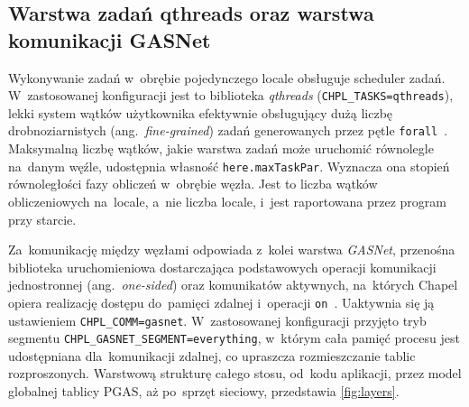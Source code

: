 \subsection{Warstwa zadań qthreads oraz warstwa komunikacji GASNet}

Wykonywanie zadań w~obrębie pojedynczego locale obsługuje scheduler
zadań. W~zastosowanej konfiguracji jest to biblioteka \emph{qthreads}
(\texttt{CHPL\_TASKS=qthreads}), lekki system wątków użytkownika efektywnie
obsługujący dużą liczbę drobnoziarnistych (ang.~\emph{fine-grained}) zadań generowanych przez pętle
\texttt{forall}~\cite{qthreads}. Maksymalną liczbę wątków, jakie warstwa zadań może
uruchomić równolegle na~danym węźle, udostępnia własność \texttt{here.maxTaskPar}. Wyznacza ona
stopień równoległości fazy obliczeń w~obrębie węzła. Jest to liczba wątków obliczeniowych na~locale,
a~nie liczba locale, i~jest raportowana przez program przy starcie.

Za~komunikację między węzłami odpowiada z~kolei warstwa \emph{GASNet}, przenośna biblioteka uruchomieniowa dostarczająca podstawowych operacji komunikacji
jednostronnej (ang.\ \emph{one-sided}) oraz komunikatów aktywnych, na~których
Chapel opiera realizację dostępu do~pamięci zdalnej i~operacji \texttt{on}~\cite{gasnet,gasnet-spec}.
Uaktywnia się ją ustawieniem \texttt{CHPL\_COMM=gasnet}. W~zastosowanej
konfiguracji przyjęto tryb segmentu
\texttt{CHPL\_\allowbreak GASNET\_\allowbreak SEGMENT\allowbreak =everything},
w~którym cała pamięć procesu jest udostępniana dla~komunikacji zdalnej, co
upraszcza rozmieszczanie tablic rozproszonych. Warstwową strukturę całego
stosu, od~kodu aplikacji, przez model globalnej tablicy PGAS, aż po~sprzęt
sieciowy, przedstawia \cref{fig:layers}.

